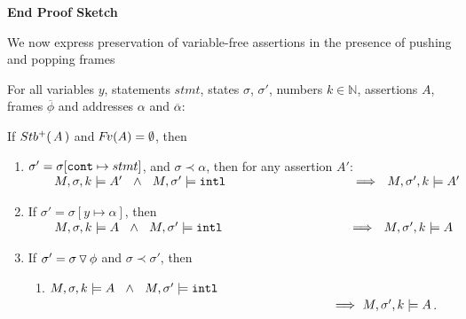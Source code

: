 {\begin{enumerate}
\end{enumerate}
{\textbf{End Proof Sketch}}


\vspace{.2cm}

We now express preservation of variable-free assertions in the presence of pushing and popping frames
 
\begin{lemma}
\label{l:push:pop}
For all   variables $y$, statements $stmt$, states $\sigma$, $\sigma'$, numbers $k\in \mathbb{N}$, assertions  $A$,
 frames $\overline {\phi}$ %
and addresses $\alpha$ and $\overline \alpha$: %


\noindent
If ${Stb^+(\, A\, )}$ and ${\hspace{-1pt}F\hspace{-1pt}}v(A)=\emptyset$, then


\begin{enumerate}

\item
\label{pp:l:same:one}
$\sigma'=\sigma[\mbox{\normalfont{\texttt{cont}}}\mapsto stmt]$,   and $\sigma \prec \alpha$, then for any assertion $A'$:\\
$\strut \ \   \ \ \ \ \satDAssertFrom M  \sigma k   A' \ \ \wedge\ \ M, \sigma' \models \intThis  \strut \hspace{3.6cm}  \Longrightarrow  \ \ \satDAssertFrom M  {\sigma'} k   A' $


\item
\label{pp:l:same:two}
If $\sigma'=\sigma[y \mapsto \alpha]$,   then \\
$\strut \ \   \ \ \ \ \satDAssertFrom M  \sigma k   A \ \ \wedge\ \ M, \sigma' \models \intThis  \strut \hspace{3.6cm}  \Longrightarrow  \ \ \satDAssertFrom M  {\sigma'} k   A $

\item
\label{pp:l:push}
If $\sigma'=\sigma  \, {\triangledown}\, \phi$   and $\sigma \prec \sigma'$, then
\begin{enumerate}
\item
\label{pp:l:one}
$M,\sigma ,{k} \models {A}  \ \ \wedge \  \ M, \sigma' \models \mbox{\normalfont{\texttt{intl}}} $ \\
$\strut \hspace{8cm} \Longrightarrow\   \satDAssertFrom M  {\sigma'} k   A $.


\end{enumerate}
\end{enumerate}
\end{lemma}}
